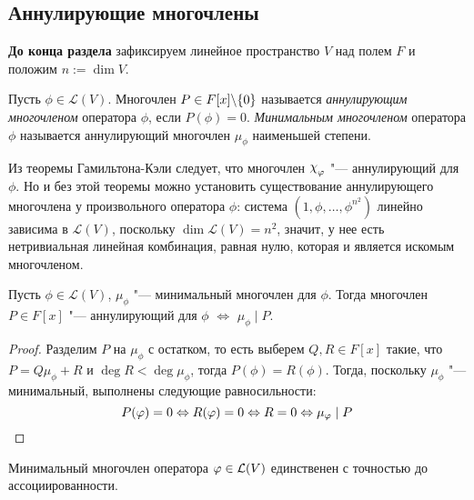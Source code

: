 \subsection{Аннулирующие многочлены}

\textbf{До конца раздела} зафиксируем линейное пространство $V$ над полем $F$ и положим $n := \dim{V}$.

\begin{definition}
	Пусть $\phi \in \mathcal{L}(V)$. Многочлен $P \in F[x] \bs \{0\}$ называется \textit{аннулирующим многочленом} оператора $\phi$, если $P(\phi) = 0$. \textit{Минимальным многочленом} оператора $\phi$ называется аннулирующий многочлен $\mu_\phi$ наименьшей степени.
\end{definition}

\begin{note}
	Из теоремы Гамильтона-Кэли следует, что многочлен $\Chi_\phi$ "--- аннулирующий для $\phi$. Но и без этой теоремы можно установить существование аннулирующего многочлена у произвольного оператора $\phi$: система $(1, \phi, \dots, \phi^{n^2})$ линейно зависима в $\mathcal{L}(V)$, поскольку $\dim{\mathcal{L}(V)} = n^2$, значит, у нее есть нетривиальная линейная комбинация, равная нулю, которая и является искомым многочленом.
\end{note}

\begin{proposition}
	Пусть $\phi \in \mathcal{L}(V)$, $\mu_\phi$ "--- минимальный многочлен для $\phi$. Тогда многочлен $P \in F[x]$ "--- аннулирующий для $\phi$ $\Leftrightarrow$ $\mu_\phi\mid P$.
\end{proposition}

\begin{proof}
	Разделим $P$ на $\mu_\phi$ с остатком, то есть выберем $Q, R \in F[x]$ такие, что $P = Q\mu_\phi + R$ и $\deg{R} < \deg{\mu_\phi}$, тогда $P(\phi) = R(\phi)$. Тогда, поскольку $\mu_\phi$ "--- минимальный, выполнены следующие равносильности:
	\[P(\phi) = 0 \Leftrightarrow R(\phi) = 0 \Leftrightarrow R = 0 \Leftrightarrow \mu_\phi\mid P\qedhere\]
\end{proof}

\begin{corollary}
	Минимальный многочлен оператора $\phi \in \mc L(V)$ единственен с точностью до ассоциированности.
\end{corollary}

